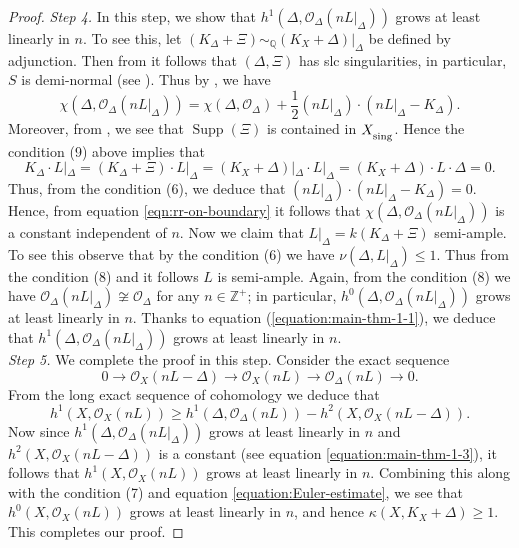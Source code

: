 \documentclass[12pt]{amsart}
\newcommand{\mbZ}{\mathbb{Z}}
\newcommand{\mbQ}{\mathbb{Q}}
\newcommand{\<}{\leq}
\def\>{\geq}
\newcommand{\D}{\Delta}
\def\mcO{\mathcal{O}}
\theoremstyle{remark}
\theoremstyle{definition}
\theoremstyle{definition}
\numberwithin{equation}{section}
\theoremstyle{definition}
\theoremstyle{definition}
\def\Supp{\operatorname{Supp}}
\def\sing{\operatorname{\textsubscript{\rm sing}}}
\begin{document}
\begin{proof}
\textit{Step 4.} In this step, we show  that $h^1(\Delta,  \mcO_{\Delta}(nL|_{\Delta}))$ grows at least linearly in $n$. 
To see this, let $(K_\D + \Xi)\sim_{\mbQ} (K_X+\Delta)|_\Delta$ be defined by adjunction. Then from \cite[Remark 1.2(5)]{Fuj00} it follows that $(\Delta, \Xi)$ has slc singularities, in particular, $S$ is demi-normal (see \cite[Definition 5.1]{Kol13}). Thus 
by \cite[Theorem 3.1]{LiuRollenske2016}, we have 
\begin{equation}\label{eqn:rr-on-boundary}
\chi(\Delta,  \mcO_{\Delta}(nL|_{\Delta})) = \chi(\Delta, \mcO_{\Delta}) +  \frac{1}2 (nL|_{\Delta}) \cdot (nL|_{\Delta} - K_{\Delta}). 
\end{equation}
Moreover, from \cite[Proposition 16.6]{Kol92}, we see that $\Supp(\Xi)$ is contained in $X_{\sing}$. 
Hence the condition (9) above implies that 
\[
K_\D \cdot L|_\D  = (K_\D + \Xi)\cdot L|_\D  = (K_X+\Delta)|_\Delta \cdot L|_\D  =  (K_X+\Delta) \cdot L \cdot \D=0.
\]
Thus, from the  condition (6), we deduce that   $(nL|_{\Delta}) \cdot (nL|_{\Delta} - K_{\Delta})=0$. 
Hence, from equation \eqref{eqn:rr-on-boundary} it follows that $\chi(\Delta, \mcO_{\Delta}(nL|_{\Delta}))$ is a constant independent of $n$.  Now we claim that $L|_{\Delta}=k(K_\Delta+\Xi)$ semi-ample. To see this observe that by  the  condition  (6) we have $\nu(\Delta, L|_{\Delta})\<1$. Thus from  the  condition  (8) and \cite[Proposition 5.2]{CHP16} it follows $L$ is semi-ample. Again, from  the  condition  (8) we have $\mcO_{\Delta}(nL|_{\Delta})\not\cong\mcO_{\Delta}$ for any $n\in\mbZ^+$; in particular,  $h^0(\Delta,  \mcO_{\Delta}(nL|_{\Delta}))$ grows  at least linearly in $n$. 
Thanks to   equation (\ref{equation:main-thm-1-1}),  
we deduce %
that $h^1(\Delta,  \mcO_{\Delta}(nL|_{\Delta}))$ grows at least linearly in $n$.\\

\textit{Step 5.} We complete the proof in this step.  
Consider the exact sequence 
\[
0 \to \mcO_X(nL-\Delta) \to \mcO_X(nL) \to \mcO_{\Delta}(nL) \to 0.
\]
From the long exact sequence of cohomology we deduce that 
\begin{equation}\label{eqn:linear-growth-for-L}
h^1(X,\mcO_{X}(nL)) \> h^1(\Delta, \mcO_{\Delta}(nL)) -  h^2(X,\mcO_{X}(nL-\Delta)).
\end{equation}
Now since $h^1(\Delta, \mcO_\Delta(nL|_\Delta))$ grows at least linearly in $n$ and $h^2(X, \mcO_X(nL-\Delta))$ is a constant (see equation \eqref{equation:main-thm-1-3}), it follows that $h^1(X, \mcO_X(nL))$ grows at least linearly in $n$. Combining this along with the condition (7) and equation \eqref{equation:Euler-estimate}, we see that $h^0(X, \mcO_X(nL))$ grows at least linearly in $n$, and hence $\kappa(X, K_X+\Delta)\>1$. This completes our proof. 
\end{proof}
\end{document}
